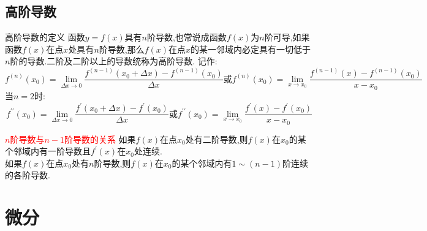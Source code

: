 \documentclass[8pt a4paper, oneside, UTF8]{ctexbook}  %
\begin{document}
\begin{sloppypar}
    \subsection{高阶导数}
    \begin{defn}{高阶导数的定义}{}
        函数$y=f(x)$具有$n$阶导数,也常说成函数$f(x)$为$n$阶可导,如果函数$f(x)$在点$x$处具有$n$阶导数,那么$f(x)$在点$x$的某一邻域内必定具有一切低于$n$阶的导数.二阶及二阶以上的导数统称为高阶导数.
        记作:
        $$
            f^{(n)}(x_0)=\lim_{\Delta x\to0}\dfrac{f^{(n-1)}(x_0+\Delta x)-f^{(n-1)}(x_0)}{\Delta x}\text{或}f^{(n)}(x_0)=\lim_{x\to x_0}\dfrac{f^{(n-1)}(x)-f^{(n-1)}(x_0)}{x-x_0}
        $$
        当$n=2$时:
        $$
            f^{\prime\prime}(x_0)=\lim_{\Delta x\to0}\dfrac{f^{\prime}(x_0+\Delta x)-f^{\prime}(x_0)}{\Delta x}\text{或}f^{\prime\prime}(x_0)=\lim_{x\to x_0}\dfrac{f^{\prime}(x)-f^{\prime}(x_0)}{x-x_0}
        $$
    \end{defn}
    \begin{corollary}{\textcolor{red}{$n$阶导数与$n-1$阶导数的关系}}{}
        如果$f(x)$在点$x_0$处有二阶导数,则$f(x)$在$x_0$的某个邻域内有一阶导数且$f^\prime(x)$在$x_0$处连续.\\
        如果$f(x)$在点$x_{0}$处有$n$阶导数,则$f(x)在x_0$的某个邻域内有$1 \sim (n-1)$阶连续的各阶导数.
    \end{corollary}
    \section{微分}

\end{sloppypar}
\end{document}
